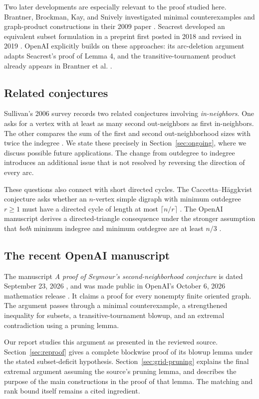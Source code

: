 \documentclass[11pt]{article}
\begin{document}
Two later developments are especially relevant to the proof studied
here. Brantner, Brockman, Kay, and Snively investigated minimal
counterexamples and graph-product constructions in their 2009 paper
\cite{bbks}. Seacrest developed an equivalent subset formulation in a
preprint first posted in 2018 and revised in 2019 \cite{seacrest}.
OpenAI explicitly builds on these approaches: its arc-deletion
argument adapts Seacrest's proof of Lemma 4, and the
transitive-tournament product already appears in Brantner et al.
\cite[Section 2]{openai}.

\subsection{Related conjectures}
Sullivan's 2006 survey records two related conjectures involving
\emph{in-neighbors}. One asks for a vertex with at least as many second
out-neighbors as first in-neighbors. The other compares the sum of the
first and second out-neighborhood sizes with twice the indegree
\cite[Conjectures 6.6 and 6.4]{sullivan}. We state these precisely in
Section~\ref{sec:ongoing}, where we discuss possible future applications.
The change from outdegree to indegree introduces an additional issue
that is not resolved by reversing the direction of every arc.

These questions also connect with short directed cycles. The
Caccetta--H\"aggkvist conjecture asks whether an $n$-vertex simple
digraph with minimum outdegree $r\ge1$ must have a directed cycle of
length at most $\lceil n/r\rceil$ \cite[Section 2]{sullivan}.
The OpenAI manuscript derives a directed-triangle consequence under
the stronger assumption that \emph{both} minimum indegree and minimum
outdegree are at least $n/3$ \cite[Corollary 6.1]{openai}.

\subsection{The recent OpenAI manuscript}
The manuscript \emph{A proof of Seymour's second-neighborhood
conjecture} is dated September 23, 2026 \cite{openai}, and was made
public in OpenAI's October 6, 2026 mathematics release \cite{release}.
It claims a proof for every nonempty finite oriented graph.
The argument passes through a minimal counterexample, a strengthened
inequality for subsets, a transitive-tournament blowup, and an
extremal contradiction using a pruning lemma.

Our report studies this argument as presented in the reviewed source.
Section~\ref{sec:reproof} gives a complete blockwise proof of its
blowup lemma under the stated subset-deficit hypothesis.
Section~\ref{sec:grid-pruning} explains the final extremal argument
assuming the source's pruning lemma, and describes the purpose of
the main constructions in the proof of that lemma. The matching and
rank bound itself remains a cited ingredient.
\end{document}

